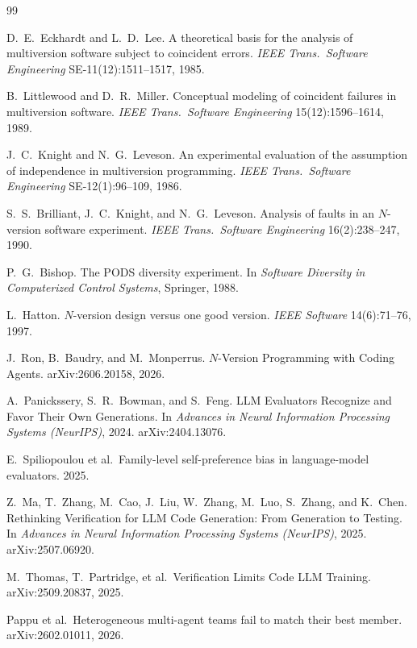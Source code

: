 \documentclass[11pt]{article}
\theoremstyle{definition}
\theoremstyle{remark}
\begin{document}
\begin{thebibliography}{99}

 D.~E.~Eckhardt and L.~D.~Lee. A theoretical basis for the analysis of
multiversion software subject to coincident errors. \emph{IEEE Trans.\ Software Engineering}
SE-11(12):1511--1517, 1985.

 B.~Littlewood and D.~R.~Miller. Conceptual modeling of coincident failures
in multiversion software. \emph{IEEE Trans.\ Software Engineering} 15(12):1596--1614, 1989.

 J.~C.~Knight and N.~G.~Leveson. An experimental evaluation of the assumption of
independence in multiversion programming. \emph{IEEE Trans.\ Software Engineering}
SE-12(1):96--109, 1986.

 S.~S.~Brilliant, J.~C.~Knight, and N.~G.~Leveson. Analysis of faults in an
$N$-version software experiment. \emph{IEEE Trans.\ Software Engineering} 16(2):238--247, 1990.

 P.~G.~Bishop. The PODS diversity experiment. In \emph{Software Diversity in
Computerized Control Systems}, Springer, 1988.

 L.~Hatton. $N$-version design versus one good version.
\emph{IEEE Software} 14(6):71--76, 1997.

 J.~Ron, B.~Baudry, and M.~Monperrus. $N$-Version Programming with Coding Agents.
arXiv:2606.20158, 2026.

 A.~Panickssery, S.~R.~Bowman, and S.~Feng. LLM Evaluators Recognize and
Favor Their Own Generations. In \emph{Advances in Neural Information Processing Systems (NeurIPS)},
2024. arXiv:2404.13076.

 E.~Spiliopoulou et al.\ Family-level self-preference bias in language-model
evaluators. 2025.

 Z.~Ma, T.~Zhang, M.~Cao, J.~Liu, W.~Zhang, M.~Luo, S.~Zhang, and
K.~Chen. Rethinking Verification for LLM Code Generation: From Generation to Testing.
In \emph{Advances in Neural Information Processing Systems (NeurIPS)}, 2025. arXiv:2507.06920.

 M.~Thomas, T.~Partridge, et al.\ Verification Limits Code LLM
Training. arXiv:2509.20837, 2025.

 Pappu et al.\ Heterogeneous multi-agent teams fail to match their best
member. arXiv:2602.01011, 2026.


\end{thebibliography}
\end{document}
